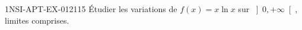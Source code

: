 \begin{exercice}{1NSI-APT-EX-012}{1}{15}
Étudier les variations de $f(x) = x\ln x$ sur $\left]0, +\infty\right[$, limites comprises.

\end{exercice}

